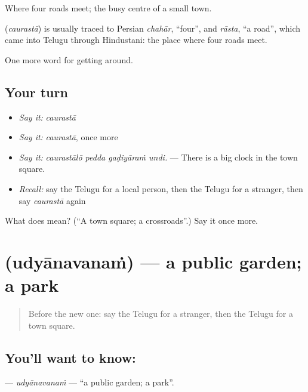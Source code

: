 Where four roads meet; the busy centre of a small town.

\begin{cousinweb}
\textbf{} (\emph{caurastā}) is usually traced to Persian \emph{chahār}, \textquotedblleft{}four\textquotedblright{}, and \emph{rāsta}, \textquotedblleft{}a road\textquotedblright{}, which came into Telugu through Hindustani: the place where four roads meet.
\end{cousinweb}

\begin{grammarlens}[title={What you've built}]
One more word for getting around.
\end{grammarlens}

\subsection*{Your turn}
\begin{itemize}
\raggedright
  \item \emph{Say it:} \emph{caurastā}
  \item \emph{Say it:} \emph{caurastā}, once more
  \item \emph{Say it:} \emph{caurastālō pedda gaḍiyāraṁ undi.} — There is a big clock in the town square.
  \item \emph{Recall:} say the Telugu for a local person, then the Telugu for a stranger, then say \emph{caurastā} again
\end{itemize}

\begin{tcolorbox}[breakable,colback=teal!4,colframe=teal!35!black,title={Before you move on}]
What does  mean? (\textquotedblleft{}A town square; a crossroads\textquotedblright{}.) Say it once more.
\end{tcolorbox}
\section[\texorpdfstring{\te{ఉద్యానవనం} (udyānavanaṁ)}{ఉద్యానవనం (udyānavanaṁ)}]{ (udyānavanaṁ) — a public garden; a park}

\label{lesson:TE-C466-udyanavanam}



\begin{quote}
Before the new one: say the Telugu for a stranger, then the Telugu for a town square.
\end{quote}

\subsection*{You'll want to know: }
\textbf{} — \emph{udyānavanaṁ} — \textquotedblleft{}a public garden; a park\textquotedblright{}.

